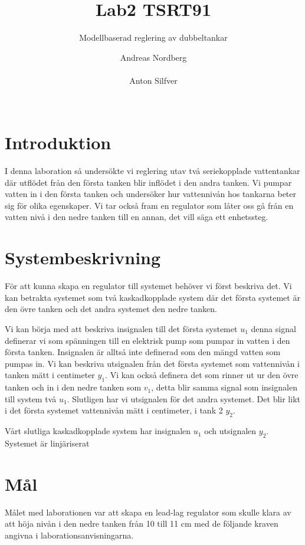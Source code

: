 \documentclass{acm_proc_article-sp}
\title{Lab2 TSRT91}
\subtitle{Modellbaserad reglering av dubbeltankar}
\author{
\alignauthor
Andreas Nordberg\\
\affaddr{Linköping, Sweden}\\
\email{andno793@student.liu.se}
\alignauthor
Anton Silfver\\
\affaddr{Linköping, Sweden}\\
\email{antsi451@student.liu.se} 
}
\begin{document}
\maketitle

\section{Introduktion}

I denna laboration så undersökte vi reglering utav två seriekopplade vattentankar där utflödet från den första tanken blir inflödet i den andra tanken. Vi pumpar vatten in i den första tanken och undersöker hur vattennivån hos tankarna beter sig för olika egenskaper. Vi tar också fram en regulator som låter oss gå från en vatten nivå i den nedre tanken till en annan, det vill säga ett enhetssteg.

\section{Systembeskrivning}

För att kunna skapa en regulator till systemet behöver vi först beskriva det. Vi kan betrakta systemet som två kaskadkopplade system där det första systemet är den övre tanken och det andra systemet den nedre tanken.

Vi kan börja med att beskriva insignalen till det första systemet $u_1$ denna signal definerar vi som spänningen till en elektrisk pump som pumpar in vatten i den första tanken. Insignalen är alltså inte definerad som den mängd vatten som pumpas in. Vi kan beskriva utsignalen från det första systemet som vattennivån i tanken mätt i centimeter $y_1$. Vi kan också definera det som rinner ut ur den övre tanken och in i den nedre tanken som $v_1$, detta blir samma signal som insignalen till system två $u_1$. Slutligen har vi utsignalen för det andra systemet. Det blir likt i det första systemet vattennivån mätt i centimeter, i tank 2 $y_2$.

Vårt slutliga kaskadkopplade system har insignalen $u_1$ och utsignalen $y_2$. Systemet är linjäriserat

\section{Mål}

Målet med laborationen var att skapa en lead-lag regulator som skulle klara av att höja nivån i den nedre tanken från 10 till 11 cm med de följande kraven angivna i laborationsanvisningarna.
\end{document}
